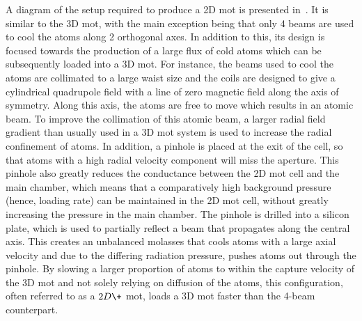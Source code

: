 A diagram of the setup required to produce a 2D \ac{mot} is presented in~. It is similar to the 3D \ac{mot}, with the main exception being that only 4 beams are used to cool the atoms along 2 orthogonal axes. In addition to this, its design is focused towards the production of a large flux of cold atoms which can be subsequently loaded into a 3D \ac{mot}. For instance, the beams used to cool the atoms are collimated to a large waist size and the coils are designed to give a cylindrical quadrupole field with a line of zero magnetic field along the axis of symmetry. Along this axis, the atoms are free to move which results in an atomic beam. To improve the collimation of this atomic beam, a larger radial field gradient than usually used in a 3D \ac{mot} system is used to increase the radial confinement of atoms. In addition, a pinhole is placed at the exit of the cell, so that atoms with a high radial velocity component will miss the aperture. This pinhole also greatly reduces the conductance between the 2D \ac{mot} cell and the main chamber, which means that a comparatively high background pressure (hence, loading rate) can be maintained in the 2D \ac{mot} cell, without greatly increasing the pressure in the main chamber. The pinhole is drilled into a silicon plate, which is used to partially reflect a beam that propagates along the central axis. This creates an unbalanced molasses that cools atoms with a large axial velocity and due to the differing radiation pressure, pushes atoms out through the pinhole. By slowing a larger proportion of atoms to within the capture velocity of the 3D \ac{mot} and not solely relying on diffusion of the atoms, this configuration, often referred to as a \(2D\+\) \ac{mot}, loads a 3D \ac{mot} faster than the 4-beam counterpart. \par\noindent 
